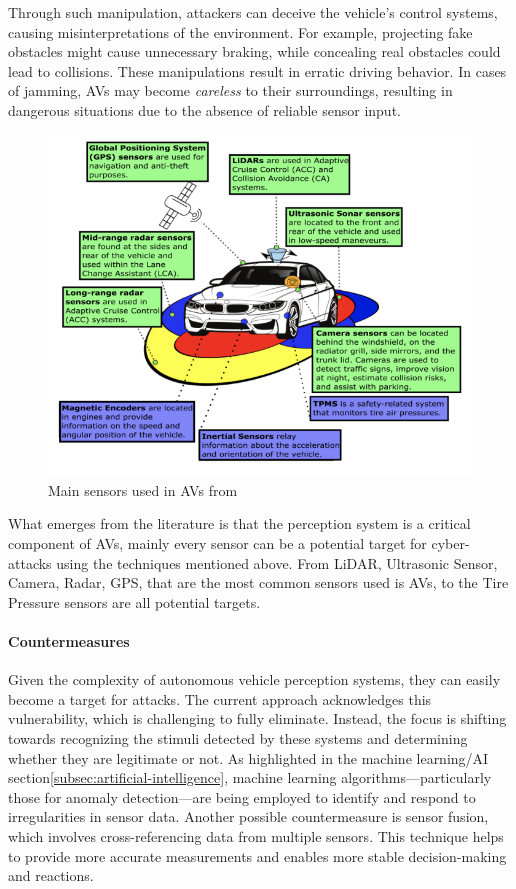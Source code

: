 Through such manipulation, attackers can deceive the vehicle's control systems, causing misinterpretations of the environment.
For example, projecting fake obstacles might cause unnecessary braking, while concealing real obstacles could lead to collisions.
These manipulations result in erratic driving behavior.
In cases of jamming, AVs may become \textit{careless} to their surroundings, resulting in dangerous situations due to the absence of reliable sensor input\cite{durlik2022cybersecurity}.

\begin{figure}[!htb]
    \centering
    \includegraphics[width=0.7\linewidth]{figures/sensors}
    \caption{Main sensors used in AVs from \cite{sensors}}
    \label{fig:sensors-2}
\end{figure}

What emerges from the literature is that the perception system is a critical component of AVs, mainly every sensor can be a potential target for cyber-attacks using the techniques mentioned above.
From LiDAR, Ultrasonic Sensor, Camera, Radar, GPS, that are the most common sensors used is AVs, to the Tire Pressure sensors are all potential targets\cite{sensors}.


\paragraph{Countermeasures}

Given the complexity of autonomous vehicle perception systems, they can easily become a target for attacks.
The current approach acknowledges this vulnerability, which is challenging to fully eliminate.
Instead, the focus is shifting towards recognizing the stimuli detected by these systems and determining whether they are legitimate or not.
As highlighted in the machine learning/AI section\ref{subsec:artificial-intelligence}, machine learning algorithms—particularly those for anomaly detection—are being employed to identify and respond to irregularities in sensor data.
Another possible countermeasure is sensor fusion, which involves cross-referencing data from multiple sensors.
This technique helps to provide more accurate measurements and enables more stable decision-making and reactions.

